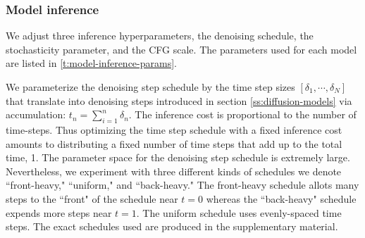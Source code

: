 \subsubsection{Model inference}

\begin{table}
\caption{Inference parameters for the models used in this work.}
\vskip 0.05in
  \label{t:model-inference-params}
  \centering
\vskip-0.2in
\end{table}

We adjust three inference hyperparameters, the denoising schedule, the stochasticity parameter, and the CFG scale. The parameters used for each model are listed in \cref{t:model-inference-params}.

We parameterize the denoising step schedule by the time step sizes $[\delta_1, \cdots, \delta_N]$ that translate into denoising steps introduced in section \ref{ss:diffusion-models} via accumulation: $t_n = \sum_{i=1}^n \delta_n$. The inference cost is proportional to the number of time-steps. Thus optimizing the time step schedule with a fixed inference cost amounts to distributing a fixed number of time steps that add up to the total time, 1. The parameter space for the denoising step schedule is extremely large. Nevertheless, we experiment with three different kinds of schedules we denote ``front-heavy," ``uniform," and ``back-heavy." The front-heavy schedule allots many steps to the ``front" of the schedule near $t=0$ whereas the ``back-heavy" schedule expends more steps near $t=1$. The uniform schedule uses evenly-spaced time steps. The exact schedules used are produced in the supplementary material.

